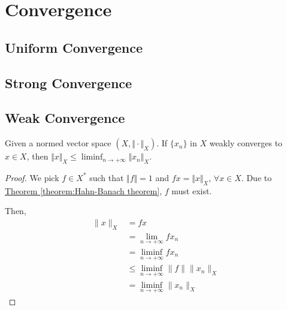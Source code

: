 \chapter{Convergence}

\section{Uniform Convergence}

\begin{definition}
\end{definition}

\section{Strong Convergence}

\begin{definition}
\end{definition}

\section{Weak Convergence}

\begin{definition}
\end{definition}

\begin{theorem}
Given a normed vector space $(X, \Vert \cdot \Vert_{X})$. If $\{x_n\}$ in $X$ weakly converges to $x \in X$, then $\Vert x \Vert_{X} \leq \liminf_{n \to +\infty} \Vert x_n \Vert_{X}$. 
\end{theorem}

\begin{proof}
We pick $f \in X^*$ such that $\Vert f \Vert = 1$ and $f x = \Vert x \Vert_{X}$, $\forall x \in X$. Due to \hyperref[theorem:Hahn-Banach theorem]{Theorem \ref*{theorem:Hahn-Banach theorem}}, $f$ must exist. 

Then, 
\begin{align*}
\lVert x \rVert_{X}
&= f x \\
&= \lim_{n \to +\infty} f x_n \\
&= \liminf_{n \to +\infty} f x_n \\
&\leq \liminf_{n \to +\infty} \lVert f \rVert \lVert x_n \rVert_{X} \\
&= \liminf_{n \to +\infty} \lVert x_n \rVert_{X}
\end{align*}
\end{proof}

